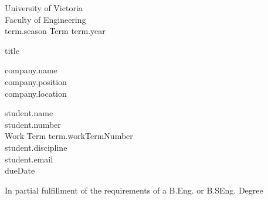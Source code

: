 \begin{center}
  University of Victoria \\
  Faculty of Engineering \\
  {{term.season}} Term {{term.year}} \\ %
  \vspace{1cm}

  {\huge {{title}}}\\
  \vspace{1cm}

  {{company.name}} \\
  {{company.position}} \\
  {{company.location}} \\      %
  \vspace{1cm}

  {{student.name}} \\
  {{student.number}} \\
  Work Term {{term.workTermNumber}} \\                %
  {{student.discipline}} \\
  {{student.email}} \\



  {{dueDate}} \\              %
  \vspace{1cm}

  In partial fulfillment of the requirements of a B.Eng. or B.SEng. Degree \\
  \vfill


\end{center}
